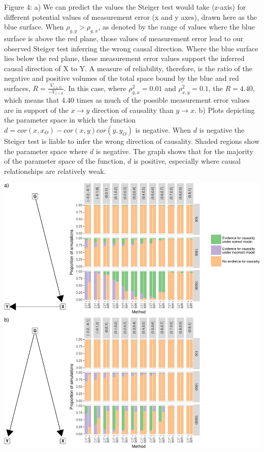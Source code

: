 \documentclass[]{article}
\begin{document}
Figure 4: a) We can predict the values the Steiger test would take
(z-axis) for different potential values of measurement error (x and y
axes), drawn here as the blue surface. When \(\rho_{g,y} > \rho_{g,x}\),
as denoted by the range of values where the blue surface is above the
red plane, those values of measurement error lead to our observed
Steiger test inferring the wrong causal direction. Where the blue
surface lies below the red plane, these measurement error values support
the inferred causal direction of X to Y. A measure of reliability,
therefore, is the ratio of the negative and positive volumes of the
total space bound by the blue and red surfaces,
\(R = \frac{V_{z \geq 0}}{ - V_{z < 0} }\). In this case, where
\(\rho_{g,x}^2 = 0.01\) and \(\rho_{x,y}^2 = 0.1\), the \(R = 4.40\),
which means that 4.40 times as much of the possible measurement error
values are in support of the \(x \rightarrow y\) direction of causality
than \(y \rightarrow x\). b) Plots depicting the parameter space in
which the function \(d = cor(x, x_O) - cor(x,y)cor(y, y_O)\) is
negative. When \(d\) is negative the Steiger test is liable to infer the
wrong direction of causality. Shaded regions show the parameter space
where \(d\) is negative. The graph shows that for the majority of the
parameter space of the function, \(d\) is positive, especially where
causal relationships are relatively weak.

\newpage

\includegraphics{manuscript_files/figure-latex/cit_mr_comparison_figure-1.pdf}
\end{document}
